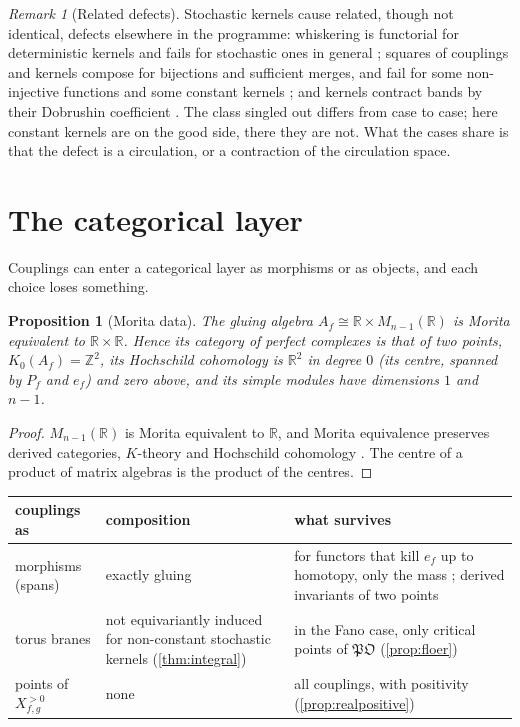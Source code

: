 \documentclass[11pt]{article}
\newtheorem{proposition}[theorem]{Proposition}
\theoremstyle{definition}
\theoremstyle{remark}
\newtheorem{remark}[theorem]{Remark}
\newcommand{\R}{\mathbb{R}}
\newcommand{\Z}{\mathbb{Z}}
\begin{document}
\begin{remark}[Related defects]\label{rem:split}
Stochastic kernels cause related, though not identical, defects elsewhere in the programme: whiskering is functorial for
deterministic kernels and fails for stochastic ones in general \cite[Thm.~10.2]{Conditionals}; squares of couplings and kernels
compose for bijections and sufficient merges, and fail for some non-injective functions and some constant kernels
\cite[Prop.~6.1]{Algebras}; and kernels contract bands by their Dobrushin coefficient \cite{Bands}. The class singled out differs from
case to case; here constant kernels are on the good side, there they are not. What the cases share is that the defect is a
circulation, or a contraction of the circulation space.
\end{remark}

\section{The categorical layer}\label{sec:categorical}

Couplings can enter a categorical layer as morphisms or as objects, and each choice loses something.

\begin{proposition}[Morita data]\label{prop:morita}
The gluing algebra $A_f\cong\R\times M_{n-1}(\R)$ \cite[Thm.~2.2]{Algebras} is Morita equivalent to $\R\times\R$. Hence its
category of perfect complexes is that of two points, $K_0(A_f)=\Z^2$, its Hochschild cohomology is $\R^2$ in degree $0$ (its centre, spanned
by $P_f$ and $e_f$) and zero above, and its simple modules have dimensions $1$ and $n-1$.
\end{proposition}
\begin{proof}
$M_{n-1}(\R)$ is Morita equivalent to $\R$, and Morita equivalence preserves derived categories, $K$-theory and Hochschild
cohomology \cite{Keller2006}. The centre of a product of matrix algebras is the product of the centres.
\end{proof}

\begin{center}
\begin{tabular}{p{3.2cm}p{4.6cm}p{6.2cm}}
\toprule
couplings as & composition & what survives\\
\midrule
morphisms (spans) & exactly gluing \cite{Algebras} & for functors that kill $e_f$ up to homotopy, only the mass \cite[Cor.~5.3]{Algebras}; derived invariants of two points\\
torus branes & not equivariantly induced for non-constant stochastic kernels (\cref{thm:integral}) & in the Fano case, only critical points of $\mathfrak{PO}$ (\cref{prop:floer})\\
points of $X^{>0}_{f,g}$ & none & all couplings, with positivity (\cref{prop:realpositive})\\
\bottomrule
\end{tabular}
\end{center}
\end{document}
